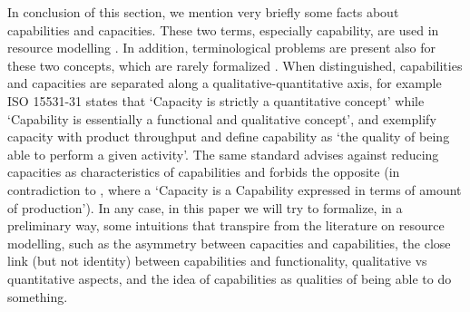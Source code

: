 \documentclass[sw]{iosart2x}
\newcommand{\quotes}[1]{`#1'}
\newcommand{\TODO}[1]{{\color{red} #1
}}
\newcommand{\TODOinline}[1]{{\color{red} #1
}}
\begin{document}
\medskip
In conclusion of this section, we mention very briefly some facts about capabilities and capacities. 
These two terms, especially capability, are used in resource modelling \cite{jarvenpaaDevelopmentOntologyDescribing2019a, sarkarOntologyModelProcess2019, jochemISOISO15531312004, solanoKnowledgeRepresentationProduct2014}. In addition, terminological problems are present also for these two concepts, which are rarely formalized \cite{sanfilippoResourcesManufacturing2015, borgoCapabilitiesCapacitiesFunctionalities2021}. When distinguished, capabilities and capacities are separated along a qualitative-quantitative axis, for example ISO 15531-31\cite{jochemISOISO15531312004} states that \quotes{Capacity is strictly a quantitative concept} while \quotes{Capability is essentially a functional and qualitative concept}, and exemplify capacity with product throughput and define capability as \quotes{the quality of being able to perform a given activity}. The same standard advises against reducing capacities as characteristics of capabilities and forbids the opposite (in contradiction to \cite{solanoKnowledgeRepresentationProduct2014}, where a \quotes{Capacity is a Capability
expressed in terms of amount of production}).
In any case, in this paper we will try to formalize, in a preliminary way, some intuitions that transpire from the literature on resource modelling, such as the asymmetry between capacities and capabilities, the close link (but not identity) between capabilities and functionality, qualitative vs quantitative aspects, and the idea of capabilities as qualities of being able to do something.



\end{document}
